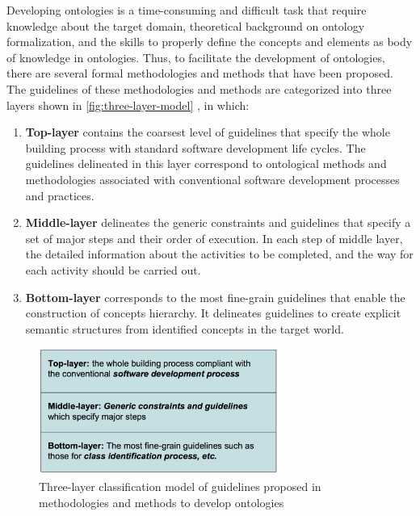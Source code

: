 Developing ontologies is a time-consuming and difficult task that require knowledge about the target domain, theoretical background on ontology formalization, and the skills to properly define the concepts and elements as body of knowledge in ontologies.
Thus, to facilitate the development of ontologies, there are several formal methodologies and methods that have been proposed.
The guidelines of these methodologies and methods are categorized into three layers shown in \autoref{fig:three-layer-model} \cite{Mizoguchi2004}, in which:

\begin{enumerate}
\item \textbf{Top-layer} contains the coarsest level of guidelines that specify the whole building process with standard software development life cycles.
The guidelines delineated in this layer correspond to ontological methods and methodologies associated with conventional software development processes and practices.

\item \textbf{Middle-layer} delineates the generic constraints and guidelines that specify a set of major steps and their order of execution.
In each step of middle layer, the detailed information about the activities to be completed, and the way for each activity should be carried out. 

\item \textbf{Bottom-layer} corresponds to the most fine-grain guidelines that enable the construction of concepts hierarchy.
It delineates guidelines to create explicit semantic structures from identified concepts in the target world.
\end{enumerate}


\begin{figure}[htb]
 \caption{Three-layer classification model of guidelines proposed in methodologies and methods to develop ontologies}
 \label{fig:three-layer-model}
 \centering
 \includegraphics[width=0.7\textwidth]{images/chap-general-background/three-layer-model.png}
\end{figure}

